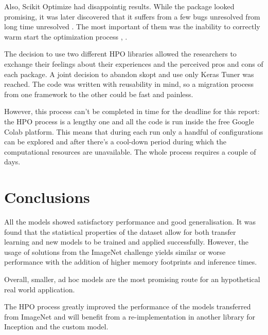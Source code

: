 Also, Scikit Optimize had disappointig results. While the package looked promising, it was later discovered that it suffers from a few bugs unresolved from long time unresolved . The most important of them was the inability to correctly warm start the optimization process \cite{issue1}, \cite{issue2}.

The decision to use two different HPO libraries allowed the researchers to exchange their feelings about their experiences and the perceived pros and cons of each package. A joint decision to abandon skopt and use only Keras Tuner was reached. The code was written with reusability in mind, so a migration process from one framework to the other could be fast and painless.

However, this process can't be completed in time for the deadline for this report: the HPO process is a lengthy one and all the code is run inside the free Google Colab platform. This means that during each run only a handful of configurations can be explored and after there's a cool-down period during which the computational resources are unavailable. The whole process requires a couple of days.


\section{Conclusions}
All the models showed satisfactory performance and good generalisation. It was found that the statistical properties of the dataset allow for both transfer learning and new models to be trained and applied successfully. However, the usage of solutions from the ImageNet challenge yields similar or worse performance with the addition of higher memory footprints and inference times.

Overall, smaller, ad hoc models are the most promising route for an hypothetical real world application.

The HPO process greatly improved the performance of the models transferred from ImageNet and will benefit from a re-implementation in another library for Inception and the custom model.






